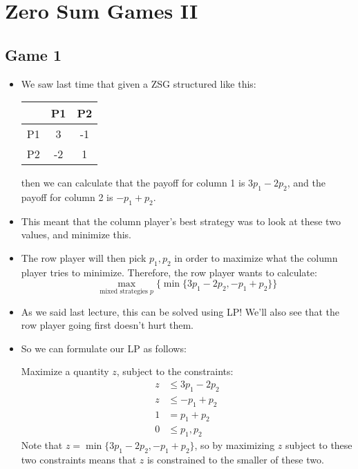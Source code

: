 \section{Zero Sum Games II}
\subsection{Game 1}
\begin{itemize}
	\item We saw last time that given a ZSG structured like this:
		\begin{center}
			\begin{tabular}{c|c|c}
				& P1& P2\\
				\hline 
				P1 & 3 & -1\\
				\hline
				P2 & -2 & 1
			\end{tabular}
		\end{center}
		then we can calculate that the payoff for column 1 is \(3p_1 - 2p_2\), and the payoff for column 
		2 is \(-p_1 + p_2\).
	\item This meant that the column player's best strategy was to look at these two values, and minimize this.  
	\item The row player will then pick \(p_1, p_2\) in order to maximize what the column player tries to 
		minimize. Therefore, the row player wants to calculate:
		\[
			\max_{\text{mixed strategies \(p\)}} \{\min \{3p_1 - 2p_2, -p_1 + p_2\} \} 
		\] 
	\item As we said last lecture, this can be solved using LP! We'll also see that the row player going 
		first doesn't hurt them. 
	\item So we can formulate our LP as follows:

		Maximize a quantity \(z\), subject to the constraints:
		\begin{align*}
			z & \le 3p_1 - 2p_2\\
			z &\le -p_1 + p_2\\
			1 &= p_1 + p_2\\
			0 &\le p_1, p_2
		\end{align*}
		Note that \(z = \min \{3p_1 - 2p_2, -p_1 + p_2\} \), so by maximizing \(z\) subject to these two 
		constraints means that \(z\) is constrained to the smaller of these two. 
\end{itemize}
